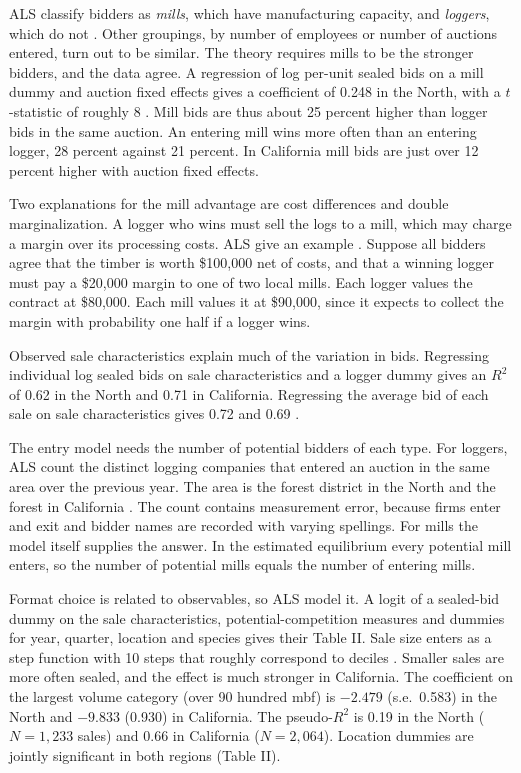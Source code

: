 ALS classify bidders as \emph{mills}, which have manufacturing capacity, and \emph{loggers}, which do
not \citep[p.~219]{AtheyLevinSeira2011}. Other groupings, by number of employees or number of auctions
entered, turn out to be similar. The theory requires mills to be the stronger bidders, and the data agree.
A regression of log per-unit sealed bids on a mill dummy and auction fixed effects gives a coefficient
of 0.248 in the North, with a $t$-statistic of roughly 8 \citep[p.~220]{AtheyLevinSeira2011}. Mill bids
are thus about 25 percent higher than logger bids in the same auction. An entering mill wins more often
than an entering logger, 28 percent against 21 percent. In California mill bids are just over 12 percent
higher with auction fixed effects.

Two explanations for the mill advantage are cost differences and double marginalization. A logger who
wins must sell the logs to a mill, which may charge a margin over its processing costs. ALS give an
example \citep[footnote 10]{AtheyLevinSeira2011}. Suppose all bidders agree that the timber is worth
\$100,000 net of costs, and that a winning logger must pay a \$20,000 margin to one of two local mills.
Each logger values the contract at \$80,000. Each mill values it at \$90,000, since it expects to
collect the margin with probability one half if a logger wins.

Observed sale characteristics explain much of the variation in bids. Regressing individual log sealed
bids on sale characteristics and a logger dummy gives an $R^2$ of 0.62 in the North and 0.71 in
California. Regressing the average bid of each sale on sale characteristics gives 0.72 and 0.69
\citep[footnote 9]{AtheyLevinSeira2011}.

The entry model needs the number of potential bidders of each type. For loggers, ALS count the distinct
logging companies that entered an auction in the same area over the previous year. The area is the forest
district in the North and the forest in California \citep[p.~221 and footnote 11]{AtheyLevinSeira2011}. The count contains measurement error, because firms enter and exit and bidder
names are recorded with varying spellings. For mills the model itself supplies the answer. In the
estimated equilibrium every potential mill enters, so the number of potential mills equals the number of
entering mills.

Format choice is related to observables, so ALS model it. A logit of a sealed-bid dummy on the sale
characteristics, potential-competition measures and dummies for year, quarter, location and species
gives their Table II. Sale size enters as a step function with 10 steps that roughly correspond to
deciles \citep[p.~227]{AtheyLevinSeira2011}. Smaller sales are more often sealed, and the effect is much
stronger in California. The coefficient on the largest volume category (over 90 hundred mbf) is $-2.479$
(s.e.\ 0.583) in the North and $-9.833$ (0.930) in California. The pseudo-$R^2$ is 0.19 in the North
($N=1{,}233$ sales) and 0.66 in California ($N=2{,}064$). Location dummies are jointly significant in
both regions (Table II).

